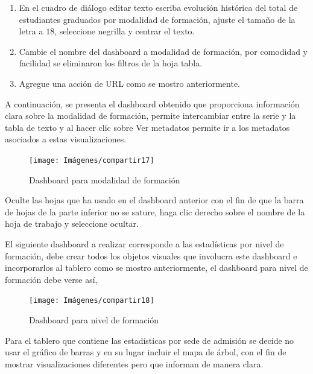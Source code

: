 \documentclass[
]{book}
\begin{document}
\begin{enumerate}
\def\labelenumi{\arabic{enumi}.}
\setcounter{enumi}{11}
\item
  En el cuadro de diálogo editar texto escriba evolución histórica del total de estudiantes graduados por modalidad de formación, ajuste el tamaño de la letra a \(18\), seleccione negrilla y centrar el texto.
\item
  Cambie el nombre del dashboard a modalidad de formación, por comodidad y facilidad se eliminaron los filtros de la hoja tabla.
\item
  Agregue una acción de URL como se mostro anteriormente.
\end{enumerate}

A continuación, se presenta el dashboard obtenido que proporciona información clara sobre la modalidad de formación, permite intercambiar entre la serie y la tabla de texto y al hacer clic sobre Ver metadatos permite ir a los metadatos asociados a estas visualizaciones.

\begin{figure}

{\centering \texttt{[image: Imágenes/compartir17]} 

}

\caption{Dashboard para modalidad de formación}\label{fig:tableromodalidaddeformacion-fig}
\end{figure}

Oculte las hojas que ha usado en el dashboard anterior con el fin de que la barra de hojas de la parte inferior no se sature, haga clic derecho sobre el nombre de la hoja de trabajo y seleccione ocultar.

El siguiente dashboard a realizar corresponde a las estadísticas por nivel de formación, debe crear todos los objetos visuales que involucra este dashboard e incorporarlos al tablero como se mostro anteriormente, el dashboard para nivel de formación debe verse así,

\begin{figure}

{\centering \texttt{[image: Imágenes/compartir18]} 

}

\caption{Dashboard para nivel de formación}\label{fig:tableroniveldefromacion-fig}
\end{figure}

Para el tablero que contiene las estadísticas por sede de admisión se decide no usar el gráfico de barras y en su lugar incluir el mapa de árbol, con el fin de mostrar visualizaciones diferentes pero que informan de manera clara.
\end{document}
